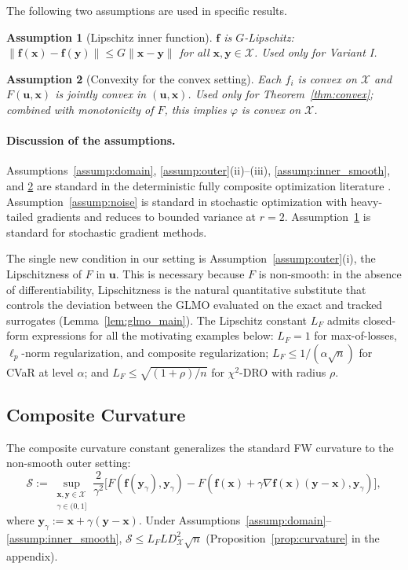 \documentclass{article}
\newcommand{\cX}{\mathcal{X}}
\def\vf{{\bm{f}}}
\def\vu{{\bm{u}}}
\def\vx{{\bm{x}}}
\def\vy{{\bm{y}}}
\newtheorem{assumption}{Assumption}
\begin{document}
The following two assumptions are used in specific results.

\begin{assumption}[Lipschitz inner function] \label{assump:inner_lipschitz}
$\vf$ is $G$-Lipschitz: $\|\vf(\vx) - \vf(\vy)\| \le G \|\vx - \vy\|$ for all $\vx, \vy \in \cX$. Used only for Variant I.
\end{assumption}

\begin{assumption}[Convexity for the convex setting] \label{assump:convex}
Each $f_i$ is convex on $\cX$ and $F(\vu, \vx)$ is jointly convex in $(\vu, \vx)$. Used only for Theorem~\ref{thm:convex}; combined with monotonicity of $F$, this implies $\varphi$ is convex on $\cX$.
\end{assumption}

\paragraph{Discussion of the assumptions.}
Assumptions~\ref{assump:domain}, \ref{assump:outer}(ii)--(iii), \ref{assump:inner_smooth}, and \ref{assump:convex} are standard in the deterministic fully composite optimization literature \citep{vladarean2023first, doikov2022high}. Assumption~\ref{assump:noise} is standard in stochastic optimization with heavy-tailed gradients and reduces to bounded variance at $r = 2$. Assumption~\ref{assump:inner_lipschitz} is standard for stochastic gradient methods.

The single new condition in our setting is Assumption~\ref{assump:outer}(i), the Lipschitzness of $F$ in $\vu$. This is necessary because $F$ is non-smooth: in the absence of differentiability, Lipschitzness is the natural quantitative substitute that controls the deviation between the GLMO evaluated on the exact and tracked surrogates (Lemma~\ref{lem:glmo_main}). The Lipschitz constant $L_F$ admits closed-form expressions for all the motivating examples below: $L_F = 1$ for max-of-losses, $\ell_p$-norm regularization, and composite regularization; $L_F \le 1/(\alpha\sqrt{n})$ for CVaR at level $\alpha$; and $L_F \le \sqrt{(1+\rho)/n}$ for $\chi^2$-DRO with radius $\rho$.

\subsection{Composite Curvature}

The composite curvature constant generalizes the standard FW curvature to the non-smooth outer setting:
\begin{equation} \label{eq:curvature_def}
\mathcal{S} := \sup_{\substack{\vx, \vy \in \cX \\ \gamma \in (0, 1]}} \frac{2}{\gamma^2} \Big[ F(\vf(\vy_\gamma), \vy_\gamma) - F(\vf(\vx) + \gamma \nabla \vf(\vx)(\vy - \vx), \vy_\gamma) \Big],
\end{equation}
where $\vy_\gamma := \vx + \gamma(\vy - \vx)$. Under Assumptions~\ref{assump:domain}--\ref{assump:inner_smooth}, $\mathcal{S} \le L_F L D_{\cX}^2 \sqrt{n}$ (Proposition~\ref{prop:curvature} in the appendix).
\end{document}
